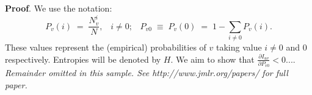 \documentclass[twoside,11pt]{article}
\newcommand{\fracpartial}[2]{\frac{\partial #1}{\partial  #2}}
\begin{document}
\section{}

\noindent
{\bf Proof}. We use the notation:
\[
P_v(i) \;=\;\frac{N_v^i}{N},\;\;\;i \neq 0;\;\;\;
P_{v0}\;\equiv\;P_v(0)\; = \;1 - \sum_{i\neq 0}P_v(i).
\]
These values represent the (empirical) probabilities of $v$
taking value $i\neq 0$ and 0 respectively.  Entropies will be denoted
by $H$. We aim to show that $\fracpartial{I_{uv}}{P_{v0}} < 0$....\\

{\noindent \em Remainder omitted in this sample. See http://www.jmlr.org/papers/ for full paper.}


\vskip 0.2in

\end{document}
